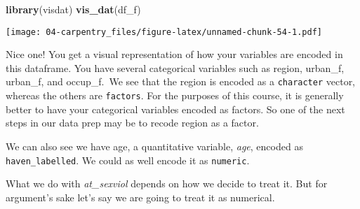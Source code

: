\documentclass[
]{book}
\newenvironment{Shaded}{\begin{snugshade}}{\end{snugshade}}
\newcommand{\FunctionTok}[1]{\textcolor[rgb]{0.13,0.29,0.53}{\textbf{#1}}}
\newcommand{\NormalTok}[1]{#1}
\newcommand{\OtherTok}[1]{\textcolor[rgb]{0.56,0.35,0.01}{#1}}
\newcommand{\SpecialCharTok}[1]{\textcolor[rgb]{0.81,0.36,0.00}{\textbf{#1}}}
\begin{document}
\begin{Shaded}
\begin{Highlighting}[]
\FunctionTok{library}\NormalTok{(visdat)}
\FunctionTok{vis\_dat}\NormalTok{(df\_f)}
\end{Highlighting}
\end{Shaded}

\texttt{[image: 04-carpentry\_files/figure-latex/unnamed-chunk-54-1.pdf]}

Nice one! You get a visual representation of how your variables are encoded in this dataframe. You have several categorical variables such as region, urban\_f, urban\_f, and occup\_f.~We see that the region is encoded as a \texttt{character} vector, whereas the others are \texttt{factors}. For the purposes of this course, it is generally better to have your categorical variables encoded as factors. So one of the next steps in our data prep may be to recode region as a factor.

\begin{Shaded}
\end{Shaded}

We can also see we have age, a quantitative variable, \emph{age}, encoded as \texttt{haven\_labelled}. We could as well encode it as \texttt{numeric}.

\begin{Shaded}
\end{Shaded}

What we do with \emph{at\_sexviol} depends on how we decide to treat it. But for argument's sake let's say we are going to treat it as numerical.

\begin{Shaded}
\end{Shaded}
\end{document}
